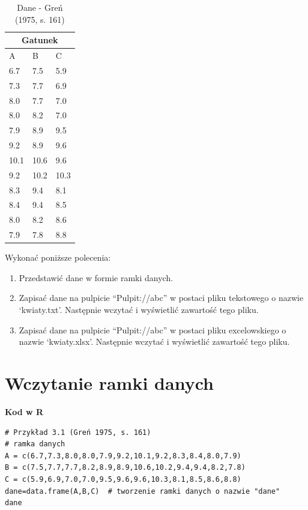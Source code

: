 \documentclass[12pt,B5paper,]{book}
\providecommand{\tightlist}{%
  \setlength{\itemsep}{0pt}\setlength{\parskip}{0pt}}
\begin{document}
\begin{table}[!ht]
\centering
\caption{Dane - Greń (1975, s. 161)}
\label{gren161}
\begin{tabular}{lll}
\multicolumn{3}{c}{Gatunek} \\ \hline
A       & B    & C    \\ \hline
6.7     & 7.5  & 5.9  \\
7.3     & 7.7  & 6.9  \\
8.0     & 7.7  & 7.0  \\
8.0     & 8.2  & 7.0  \\
7.9     & 8.9  & 9.5  \\
9.2     & 8.9  & 9.6  \\
10.1    & 10.6 & 9.6  \\
9.2     & 10.2 & 10.3 \\
8.3     & 9.4  & 8.1  \\
8.4     & 9.4  & 8.5  \\
8.0     & 8.2  & 8.6  \\
7.9     & 7.8  & 8.8 \\ \hline
\end{tabular}
\end{table}

Wykonać poniższe polecenia:

\begin{enumerate}
\def\labelenumi{\arabic{enumi}.}
\tightlist
\item
  Przedstawić dane w formie ramki danych.
\item
  Zapisać dane na pulpicie ``Pulpit://abc'' w postaci pliku tekstowego o
  nazwie `kwiaty.txt'. Następnie wczytać i wyświetlić zawartość tego
  pliku.
\item
  Zapisać dane na pulpicie ``Pulpit://abc'' w postaci pliku
  excelowskiego o nazwie `kwiaty.xlsx'. Następnie wczytać i wyświetlić
  zawartość tego pliku.
\end{enumerate}

\vspace{0.8cm}

\section{Wczytanie ramki danych}\label{wczytanie-ramki-danych}

\textbf{Kod w R}

\begin{verbatim}
# Przykład 3.1 (Greń 1975, s. 161)
# ramka danych
A = c(6.7,7.3,8.0,8.0,7.9,9.2,10.1,9.2,8.3,8.4,8.0,7.9)
B = c(7.5,7.7,7.7,8.2,8.9,8.9,10.6,10.2,9.4,9.4,8.2,7.8)
C = c(5.9,6.9,7.0,7.0,9.5,9.6,9.6,10.3,8.1,8.5,8.6,8.8)
dane=data.frame(A,B,C)  # tworzenie ramki danych o nazwie "dane"
dane
\end{verbatim}
\end{document}
